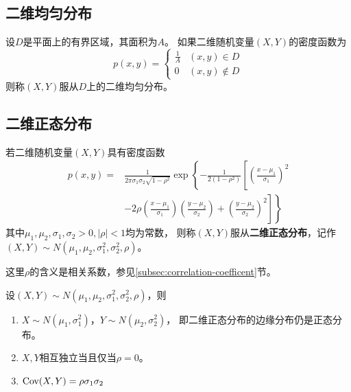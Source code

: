 \subsection{二维均匀分布}
\begin{definition}[二维均匀分布]
  设$D$是平面上的有界区域，其面积为$A$。
  如果二维随机变量$(X,Y)$的密度函数为
  \begin{displaymath}
    p(x,y) = \begin{cases}
      \frac{1}{A} & (x,y)\in D \\
      0 & (x,y)\notin D
    \end{cases}
  \end{displaymath}
  则称$(X,Y)$服从$D$上的二维均匀分布。
\end{definition}

\subsection{二维正态分布}
\begin{definition}[二维正态分布]
  若二维随机变量$(X,Y)$具有密度函数
  \begin{align*}
    p(x,y)=&\frac{1}{2\pi\sigma_1\sigma_2\sqrt{1-\rho^2}}
      \exp\left\{-\frac{1}{2(1-\rho^2)}\left[
        \left(\frac{x-\mu_1}{\sigma_1}\right)^2\right.\right.\\
        &\left.\left.-2\rho\left(\frac{x-\mu_1}{\sigma_1}\right)
          \left(\frac{y-\mu_2}{\sigma_2}\right)
        +\left(\frac{y-\mu_2}{\sigma_2}\right)^2\right]\right\}
  \end{align*}
  其中$\mu_1,\mu_2,\sigma_1,\sigma_2 > 0, |\rho| < 1$均为常数，
  则称$(X,Y)$服从\textbf{二维正态分布}，记作
  $(X,Y)\sim N(\mu_1,\mu_2,\sigma_1^2,\sigma_2^2,\rho)$。
\end{definition}

\begin{remark}
  这里$\rho$的含义是相关系数，参见\ref{subsec:correlation-coefficent}节。
\end{remark}

\begin{theorem}[二维正态分布的性质]
  设$(X,Y)\sim N(\mu_1,\mu_2,\sigma_1^2,\sigma_2^2,\rho)$，则
  \begin{enumerate}
    \item
    $X\sim N(\mu_1,\sigma_1^2)$，$Y\sim N(\mu_2,\sigma_2^2)$，
    即二维正态分布的边缘分布仍是正态分布。
    \item
    $X,Y$相互独立当且仅当$\rho = 0$。
    \item
    $\textrm{Cov}(X,Y) = \rho\sigma_1\sigma_2$
  \end{enumerate}
\end{theorem}
